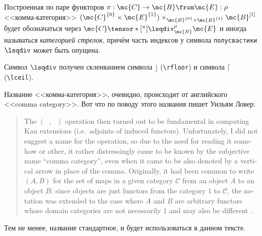 \documentclass[
	extrafontsizes,
	11pt,
	hyphens,
]{memoir}
\begin{document}

\begin{convention}
Построенная по паре функторов \(\pi : \mc{C} \to \mc{B} \from \mc{E} : \rho\) <<комма-категория>>
\((\mc{C}^{\{0\}} \times \mc{E}^{\{1\}}) \times_{\mc{B}^{\{0\}} \times \mc{B}^{\{1\}}} \mc{B}^{[1]}\)
будет обозначаться через \(\mc{C} \tensor*[^\pi]{\lsqdiv}{^\rho_{\mc{B}}} \mc{E}\) и иногда называться \emph{категорией стрелок}, причём часть индексов у символа \texttt{полусвастики} \(\lsqdiv\) может быть опущена.
\end{convention}

\begin{remark}
Символ \(\lsqdiv\) получен склеиванием символа \(\rfloor\) (\texttt{\textbackslash{}rfloor}) и символа \(\lceil\) (\texttt{\textbackslash{}lceil}).
\end{remark}

\begin{remark}
Название <<комма-категория>>, очевидно, происходит от английского <<\textenglish{comma category}>>.
Вот что по поводу этого названия пишет Уильям Ловер:
\begin{quote}
\textenglish{%
The \((\phantom{x}, \phantom{x})\) operation then turned out to be fundamental in computing Kan extensions (i.e.\ adjoints of induced functors). Unfortunately, I did not suggest a name for the operation, so due to the need for reading it somehow or other, it rather distressingly came to be known by the subjective name ``comma category'', even when it came to be also denoted by a vertical arrow in place of the comma. Originally, it had been common to write \((A, B)\) for the set of maps in a given category \(\mathcal{C}\) from an object \(A\) to an object \(B\); since objects are just functors from the category \(1\) to \(\mathcal{C}\), the notation was extended to the case where \(A\) and \(B\) are arbitrary functors whose domain categories are not necessarily \(1\) and may also be different \autocite[13]{Lawvere_Thesis_Reprint}.}
\end{quote}
Тем не менее, название стандартное, и будет использоваться в данном тексте.
\end{remark}
\end{document}
